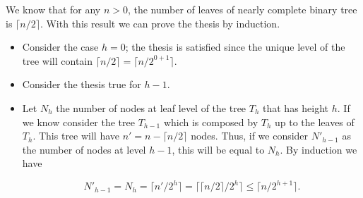 \documentclass{article}
\begin{document}
	We know that for any $n > 0$, the number of leaves of nearly complete binary tree is $ \lceil n/2 \rceil$. With this result we can prove the thesis by induction. 
	\begin{itemize}
		\item Consider the case $h=0$; the thesis is satisfied since the unique level of the tree will contain $ \lceil n/2 \rceil = \lceil n/2^{0+1} \rceil$.
		\item Consider the thesis true for $h-1$.
		\item Let $N_h$ the number of nodes at leaf level of the tree $T_h$ that has height $h$. If we know consider the tree $T_{h-1}$ which is composed by $T_h$ up to the leaves of $T_h$. This tree will have $n' = n- \lceil n/2 \rceil$ nodes. Thus, if we consider $N'_{h-1}$ as the number of nodes at level $h-1$, this will be equal to $N_h$. By induction we have 
		
		$$
		N'_{h-1} = N_{h} = \lceil n' / 2^h\rceil = \lceil \lceil n/2\rceil / 2^h\rceil \leq \lceil n / 2^{h+1}\rceil.
		$$ 
	\end{itemize}

	
	
	
\end{document}

